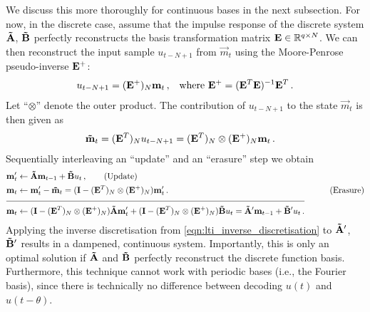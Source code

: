 We discuss this more thoroughly for continuous bases in the next subsection.
For now, in the discrete case, assume that the impulse response of the discrete \LTI system $\mathbf{\tilde A}$, $\mathbf{\tilde B}$ perfectly reconstructs the basis transformation matrix $\mathbf{E} \in \mathbb{R}^{q \times N}$.
We can then reconstruct the input sample $u_{t - N + 1}$ from $\vec m_t$ using the Moore-Penrose pseudo-inverse $\mathbf{E}^+$:
\begin{align*}
	u_{t - N + 1} &= (\mathbf{E}^+)_{N} \mathbf{m}_t \,, & \text{where } \mathbf{E}^+ = (\mathbf{E}^T \mathbf{E})^{-1} \mathbf{E}^T\,.
\end{align*}
Let \enquote{$\otimes$} denote the outer product.
The contribution of $u_{t - N + 1}$ to the state $\vec m_t$ is then given as
\begin{align*}
 	\mathbf{\tilde m}_t &= ( \mathbf{E}^T)_N u_{t - N + 1} = ( \mathbf{E}^T)_N \otimes (\mathbf{E}^+)_N\mathbf{m}_t \,.
\end{align*}
Sequentially interleaving an \enquote{update} and an \enquote{erasure} step we obtain
\begin{align}
 	\vec m_t' &\gets \mat{\tilde A} \vec m_{t - 1} + \mat{\tilde B} u_t \,, \tag{Update}\\
 	\vec m_t &\gets \vec m_t' - \vec{\tilde m}_t = ( \mat I - ( \mat E^T )_N \otimes (\mat E^+)_N ) \vec m_t' \,. & \tag{Erasure}\\[-0.5em]
 	\cline{1-2}
 	\vec m_t &\gets
 		(\mat I - ( \mat E^T )_N \otimes (\mat E^+)_N ) \mat{\tilde A} \vec m'_t
 		+ (\mat I - ( \mat E^T )_N \otimes (\mat E^+ )_N ) \mat{\tilde B} u_t
 		=   \mat{{\tilde A}'} \vec m_{t - 1} + \mat{{\tilde B}'} u_t  \,.
	\label{eqn:information_erasure_discrete}
\end{align}
Applying the inverse discretisation from \cref{eqn:lti_inverse_discretisation} to $\mathbf{\tilde A}'$, $\mathbf{\tilde B}'$ results in a dampened, continuous \LTI system.
Importantly, this is only an optimal solution if $\mathbf{\tilde A}$ and $\mathbf{\tilde B}$ perfectly reconstruct the discrete function basis.
Furthermore, this technique cannot work with periodic bases (i.e., the Fourier basis), since there is technically no difference between decoding $u(t)$ and $u(t - \theta)$.

